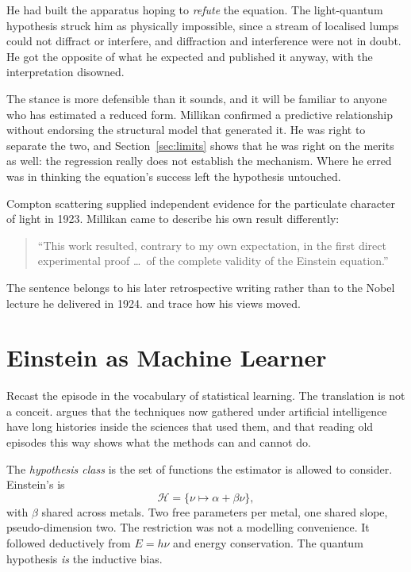 \documentclass[11pt]{article}
\begin{document}
He had built the apparatus hoping to \emph{refute} the equation.  The
light-quantum hypothesis struck him as physically impossible, since a stream of
localised lumps could not diffract or interfere, and diffraction and
interference were not in doubt.  He got the opposite of what he expected and
published it anyway, with the interpretation disowned.

The stance is more defensible than it sounds, and it will be familiar to
anyone who has estimated a reduced form.  Millikan confirmed a predictive
relationship without endorsing the structural model that generated it.  He was
right to separate the two, and Section~\ref{sec:limits} shows that he was
right on the merits as well: the regression really does not establish the
mechanism.  Where
he erred was in thinking the equation's success left the hypothesis
untouched.

Compton scattering \citep{Compton1923} supplied independent evidence for the
particulate character of light in 1923.  Millikan came to describe his own
result differently:
\begin{quote}
  ``This work resulted, contrary to my own expectation, in the first direct
  experimental proof \ldots\ of the complete validity of the Einstein
  equation.''
\end{quote}
\noindent The sentence belongs to his later retrospective writing rather than
to the Nobel lecture he delivered in 1924.  \citet{Holton1999} and
\citet{Pais1982} trace how his views moved.

\section{Einstein as Machine Learner}

Recast the episode in the vocabulary of statistical learning.  The
translation is not a conceit.  \citet{sargent2025sources} argues that the
techniques now gathered under artificial intelligence have long histories
inside the sciences that used them, and that reading old episodes this way
shows what the methods can and cannot do.

The \emph{hypothesis class} is the set of functions the estimator is allowed to
consider.  Einstein's is
\begin{equation}\label{eq:class}
  \mathcal{H} = \{ \nu \mapsto \alpha + \beta\nu \},
\end{equation}
with $\beta$ shared across metals.  Two free parameters per metal, one shared
slope, pseudo-dimension two.  The restriction was not a modelling convenience.
It followed deductively from $E = h\nu$ and energy conservation.  The quantum
hypothesis \emph{is} the inductive bias.
\end{document}
